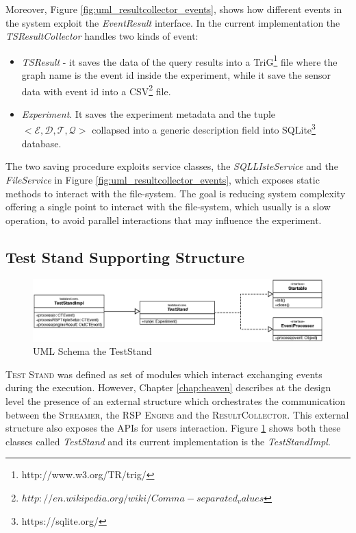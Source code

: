 Moreover, Figure \ref{fig:uml_resultcollector_events}, shows how different events in the system exploit the \textit{EventResult} interface. In the current implementation the \textit{TSResultCollector} handles two kinds of event:
\begin{itemize}
\item \textit{TSResult} - it saves the data of the query results into a TriG\footnote{http://www.w3.org/TR/trig/} file where the graph name is the event id inside the experiment, while it save the sensor data with event id into a CSV\footnote{$http://en.wikipedia.org/wiki/Comma-separated_values$} file. 
\item \textit{Experiment}. It saves the experiment metadata and the tuple \\ $<\mathcal{E},\mathcal{D},\mathcal{T},\mathcal{Q}>$ collapsed into a generic description field into SQLite\footnote{https://sqlite.org/} database.
\end{itemize} 

The two saving procedure exploits service classes, the \textit{SQLLIsteService} and the \textit{FileService} in Figure \ref{fig:uml_resultcollector_events}, which exposes static methods to interact with the file-system. The goal is  reducing system complexity offering a single point to interact with the file-system, which usually is a slow operation, to avoid parallel interactions that may influence the experiment. 


\subsection{Test Stand Supporting Structure}\label{sec:teststand-impl}


\begin{figure}[tbh]
  \centering
	\includegraphics[width=\linewidth]{images/uml_teststand}
	\caption{UML Schema the TestStand} 
  	\label{fig:uml_teststand}
\end{figure}


\name \textsc{Test Stand} was defined as set of modules which interact exchanging events during the execution. However, Chapter \ref{chap:heaven} describes at the design level the presence of an external structure which orchestrates the communication between the \textsc{Streamer}, the \textsc{RSP Engine} and the \textsc{ResultCollector}. This external structure also exposes the APIs for users interaction. Figure \ref{fig:uml_teststand} shows both these classes called \textit{TestStand} and its current implementation is the \textit{TestStandImpl}.



